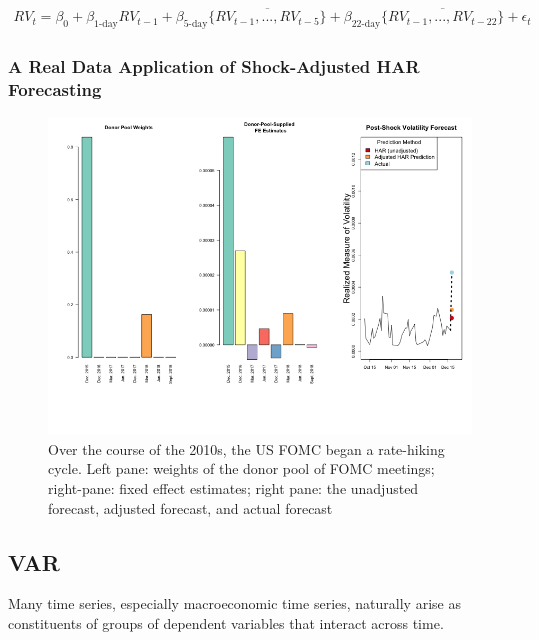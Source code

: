 \documentclass[11pt]{article}
\theoremstyle{definition}
\begin{document}
\begin{align*}
RV_{t} = \beta_{0} + \beta_{\text{1-day}}RV_{t-1} + \beta_{\text{5-day}}\overline{\{RV_{t-1},...,RV_{t-5}\}}+\beta_{\text{22-day}}\overline{\{RV_{t-1},...,RV_{t-22}\}} + \epsilon_{t}
\end{align*}

\subsubsection{A Real Data Application of Shock-Adjusted HAR Forecasting}

\begin{figure}[h!]
  \begin{center}
    \includegraphics[scale=.4]{real_data_output_plots/savetime_SatJun151644072024__^VIX-^IRX-^XAU_^VIX_2018-12-18-2015-12-15-2016-12-13-2017-03-14-2017-06-13-2017-12-12-2018-03-20-2018-06-12-2018-09-25.png}
    \caption{Over the course of the 2010s, the US FOMC began a rate-hiking cycle.  Left pane: weights of the donor pool of FOMC meetings; right-pane: fixed effect estimates; right pane: the unadjusted forecast, adjusted forecast, and actual forecast}
    \label{fig:six_plots}
    \end{center}
  \end{figure}

\subsection{VAR}
Many time series, especially macroeconomic time series, naturally arise as constituents of groups of dependent variables that interact across time.
\end{document}
